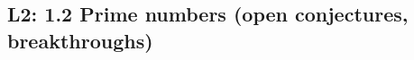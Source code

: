 \documentclass[10pt]{article}
\theoremstyle{definition}
\newtheorem{definition}{Definition}[section]
\newtheorem{example}{Example}[section]
\newtheorem{remark}{Remark}[section]
\theoremstyle{plain}
\numberwithin{equation}{section}
\begin{document}













\newpage
\subsection{L2: 1.2 Prime numbers (open conjectures, breakthroughs)}






\end{document}
